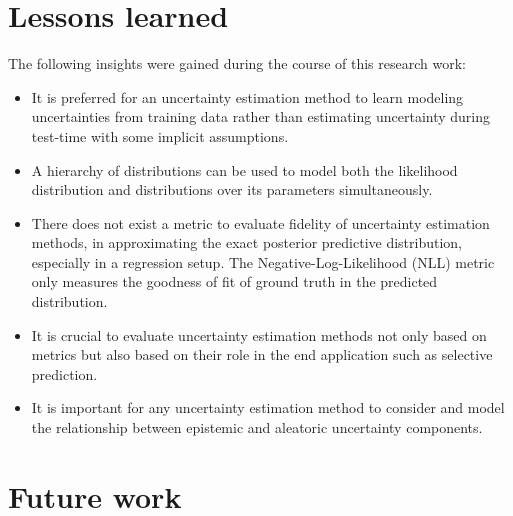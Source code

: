     \section{Lessons learned}
    The following insights were gained during the course of this research work:
    \begin{itemize}
    	\item It is preferred for an uncertainty estimation method to learn modeling uncertainties from training data rather than estimating uncertainty during test-time with some implicit assumptions.
    	\item A hierarchy of distributions can be used to model both the likelihood distribution and distributions over its parameters simultaneously.
    	\item There does not exist a metric  to evaluate fidelity of uncertainty estimation methods, in approximating the exact posterior predictive  distribution, especially in a regression setup. The Negative-Log-Likelihood (NLL) metric only measures the goodness of fit of ground truth in the predicted distribution.
    	\item It is crucial to evaluate uncertainty estimation methods not only based on metrics but also based on their role in the end application such as selective prediction. 
    	\item It is important for any uncertainty estimation method to consider and model the relationship between epistemic and aleatoric uncertainty components.    	
    \end{itemize}

    \section{Future work}

